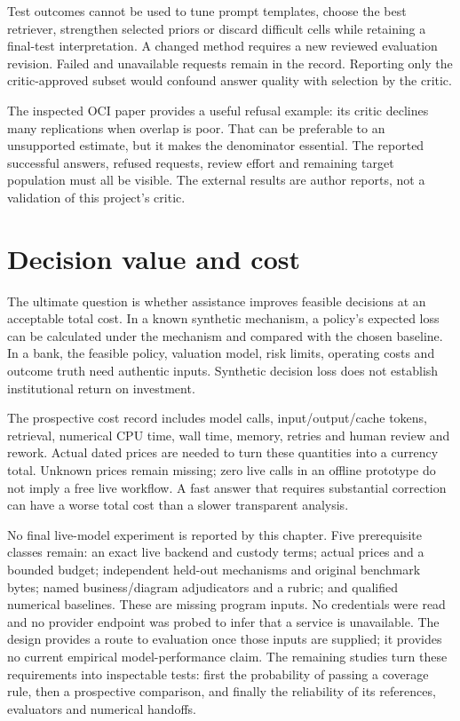 Test outcomes cannot be used to tune prompt templates, choose the best
retriever, strengthen selected priors or discard difficult cells while
retaining a final-test interpretation. A changed method requires a new
reviewed evaluation revision. Failed and unavailable requests remain in the
record. Reporting only the critic-approved subset would confound answer
quality with selection by the critic.

The inspected OCI paper provides a useful refusal example: its critic
declines many replications when overlap is poor. That can be preferable
to an unsupported estimate, but it makes the denominator essential.
The reported successful answers, refused requests, review effort and
remaining target population must all be visible. The external results
are author reports, not a validation of this project's critic.
\citep{v12_la_2607_22443}

\section{Decision value and cost}

The ultimate question is whether assistance improves feasible decisions at
an acceptable total cost. In a known synthetic mechanism, a policy's expected
loss can be calculated under the mechanism and compared with the chosen
baseline. In a bank, the feasible policy, valuation model, risk limits,
operating costs and outcome truth need authentic inputs. Synthetic decision
loss does not establish institutional return on investment.

The prospective cost record includes model calls, input/output/cache tokens,
retrieval, numerical CPU time, wall time, memory, retries and human review
and rework. Actual dated prices are needed to turn these quantities into a
currency total. Unknown prices remain missing; zero live calls in an offline
prototype do not imply a free live workflow. A fast answer that requires
substantial correction can have a worse total cost than a slower transparent
analysis.

No final live-model experiment is reported by this chapter. Five prerequisite
classes remain: an exact live backend and custody terms; actual prices and
a bounded budget; independent held-out mechanisms and original benchmark
bytes; named business/diagram adjudicators and a rubric; and qualified
numerical baselines. These are missing program inputs. No credentials were
read and no provider endpoint was probed to infer that a service is unavailable.
The design provides a route to evaluation once those inputs are supplied;
it provides no current empirical model-performance claim. The remaining studies turn these requirements into inspectable tests: first the probability of passing a coverage rule, then a prospective comparison, and finally the reliability of its references, evaluators and numerical handoffs.


